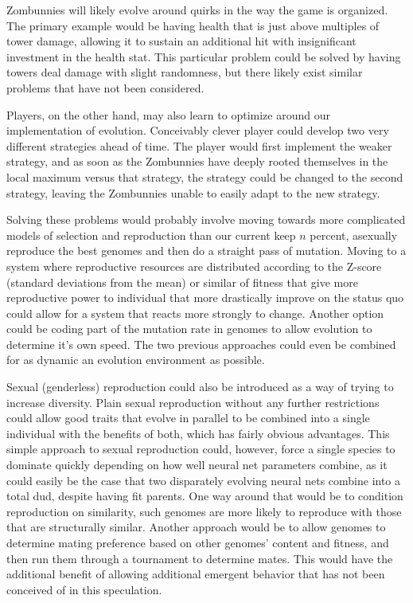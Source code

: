 \documentclass[letterpaper]{article}
\begin{document}
Zombunnies will likely evolve around quirks in the way the
game is organized. The primary example would be having health that is just above
multiples of tower damage, allowing it to sustain an additional hit with
insignificant investment in the health stat. This particular problem could be
solved by having towers deal damage with slight randomness, but there likely
exist similar problems that have not been considered.

Players, on the other hand, may also learn to optimize around our implementation
of evolution. Conceivably clever player could develop two very different
strategies ahead of time. The player would first implement the weaker strategy,
and as soon as the Zombunnies have deeply rooted themselves in the local maximum
versus that strategy, the strategy could be changed to the second strategy,
leaving the Zombunnies unable to easily adapt to the new strategy.

Solving these problems would probably involve moving towards more complicated
models of selection and reproduction than our current keep \(n\) percent,
asexually reproduce the best genomes and then do a straight pass of mutation.
Moving to a system where reproductive resources are distributed according to the
Z-score (standard deviations from the mean) or similar of fitness that give more
reproductive power to individual that more drastically improve on the status quo
could allow for a system that reacts more strongly to change. Another option
could be coding part of the mutation rate in genomes to allow evolution to
determine it's own speed. The two previous approaches could even be combined for
as dynamic an evolution environment as possible.

Sexual (genderless) reproduction could also be introduced as a way of trying to
increase diversity. Plain sexual reproduction without any further restrictions
could allow good traits that evolve in parallel to be combined into a single
individual with the benefits of both, which has fairly obvious advantages.
This simple approach to sexual reproduction could, however, force a single
species to dominate quickly depending on how well neural net parameters combine,
as it could easily be the case that two disparately evolving neural nets combine
into a total dud, despite having fit parents. One way around that would be to
condition reproduction on similarity, such genomes are more likely to reproduce
with those that are structurally similar. Another approach would be to allow
genomes to determine mating preference based on other genomes' content and
fitness, and then run them through a tournament to determine mates. This would
have the additional benefit of allowing additional emergent behavior that has
not been conceived of in this speculation.
\end{document}
